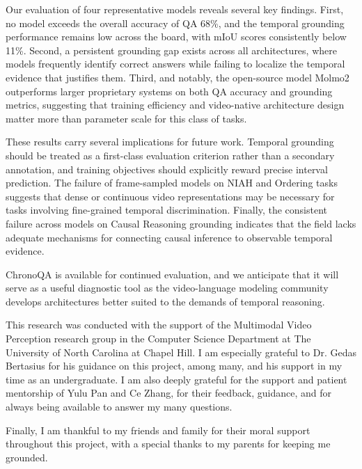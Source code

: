 \documentclass[sigconf,natbib=false,nonacm]{acmart}
\begin{document}
Our evaluation of four representative models reveals several key findings. First, no model exceeds the overall accuracy of QA 68\%, and the temporal grounding performance remains low across the board, with mIoU scores consistently below 11\%. Second, a persistent grounding gap exists across all architectures, where models frequently identify correct answers while failing to localize the temporal evidence that justifies them. Third, and notably, the open-source model Molmo2 outperforms larger proprietary systems on both QA accuracy and grounding metrics, suggesting that training efficiency and video-native architecture design matter more than parameter scale for this class of tasks.

These results carry several implications for future work. Temporal grounding should be treated as a first-class evaluation criterion rather than a secondary annotation, and training objectives should explicitly reward precise interval prediction. The failure of frame-sampled models on NIAH and Ordering tasks suggests that dense or continuous video representations may be necessary for tasks involving fine-grained temporal discrimination. Finally, the consistent failure across models on Causal Reasoning grounding indicates that the field lacks adequate mechanisms for connecting causal inference to observable temporal evidence.

ChronoQA is available for continued evaluation, and we anticipate that it will serve as a useful diagnostic tool as the video-language modeling community develops architectures better suited to the demands of temporal reasoning.

\begin{acks}

This research was conducted with the support of the Multimodal Video Perception research group in the Computer Science Department at The University of North Carolina at Chapel Hill. I am especially grateful to Dr. Gedas Bertasius for his guidance on this project, among many, and his support in my time as an undergraduate. I am also deeply grateful for the support and patient mentorship of Yulu Pan and Ce Zhang, for their feedback, guidance, and for always being available to answer my many questions.

Finally, I am thankful to my friends and family for their moral support throughout this project, with a special thanks to my parents for keeping me grounded.
\end{acks}


\printbibliography[title={References}]
\end{document}
